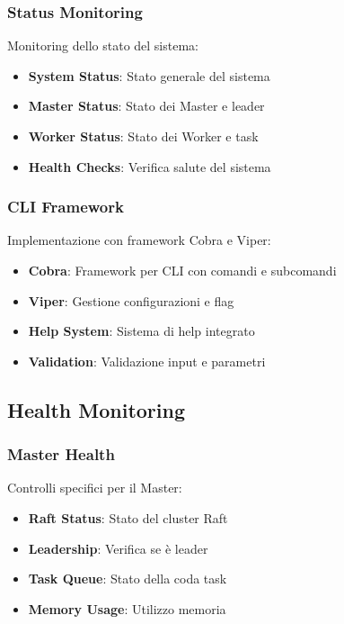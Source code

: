 \documentclass[12pt,a4paper]{article}
\begin{document}
\subsubsection{Status Monitoring}

Monitoring dello stato del sistema:

\begin{itemize}
\item \textbf{System Status}: Stato generale del sistema
\item \textbf{Master Status}: Stato dei Master e leader
\item \textbf{Worker Status}: Stato dei Worker e task
\item \textbf{Health Checks}: Verifica salute del sistema
\end{itemize}

\subsubsection{CLI Framework}

Implementazione con framework Cobra e Viper:

\begin{itemize}
\item \textbf{Cobra}: Framework per CLI con comandi e subcomandi
\item \textbf{Viper}: Gestione configurazioni e flag
\item \textbf{Help System}: Sistema di help integrato
\item \textbf{Validation}: Validazione input e parametri
\end{itemize}

\subsection{Health Monitoring}

\subsubsection{Master Health}

Controlli specifici per il Master:

\begin{itemize}
\item \textbf{Raft Status}: Stato del cluster Raft
\item \textbf{Leadership}: Verifica se è leader
\item \textbf{Task Queue}: Stato della coda task
\item \textbf{Memory Usage}: Utilizzo memoria
\end{itemize}
\end{document}
